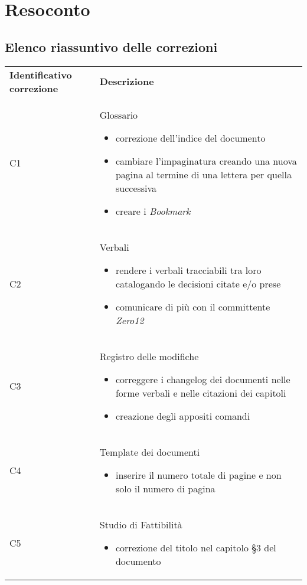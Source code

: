\clearpage
\section{Resoconto}
	\subsection{Elenco riassuntivo delle correzioni}
	\label{sec:elenco_riassunto}
		\begin{center}
			\renewcommand{\arraystretch}{1.5}
			\begin{longtable}{  p{3cm} p{11.2cm}  }
				\rowcolor{tableHeadYellow}
				\textbf{Identificativo correzione} & \textbf{Descrizione}\\
				C1 & 	 	Glossario
								\begin{itemize}
									\item correzione dell'indice del documento
									\item cambiare l'impaginatura creando una nuova pagina al termine di una lettera per quella successiva
									\item creare i \textit{Bookmark}
								\end{itemize}
				\\		
				C2 & 		Verbali
								\begin{itemize}
									\item rendere i verbali tracciabili tra loro catalogando le decisioni citate e/o prese 
									\item comunicare di più con il committente \textit{Zero12}
								\end{itemize}
				\\
				C3 & 		Registro delle modifiche
								\begin{itemize}
									\item correggere i changelog dei documenti nelle forme verbali e nelle citazioni dei capitoli
									\item creazione degli appositi comandi
								\end{itemize}
				\\
				C4 & 		Template dei documenti
								\begin{itemize}
									\item inserire il numero totale di pagine e non solo il numero di pagina
								\end{itemize}
				
				\\
				C5 & 		Studio di Fattibilità
								\begin{itemize}
									\item correzione del titolo nel capitolo §3 del documento
								\end{itemize}
				

\end{longtable}
\end{center}

